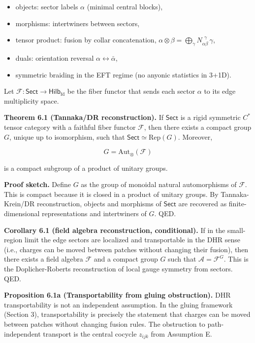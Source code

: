 \documentclass[11pt,a4paper]{article}
\theoremstyle{remark}
\providecommand{\tightlist}{%
  \setlength{\itemsep}{0pt}\setlength{\parskip}{0pt}}
\begin{document}
\begin{itemize}
\tightlist
\item
  objects: sector labels \(\alpha\) (minimal central blocks),
\item
  morphisms: intertwiners between sectors,
\item
  tensor product: fusion by collar concatenation, \(\alpha \otimes \beta = \bigoplus_\gamma N_{\alpha\beta}^{\ \ \gamma}\,\gamma\),
\item
  duals: orientation reversal \(\alpha \leftrightarrow \bar\alpha\),
\item
  symmetric braiding in the EFT regime (no anyonic statistics in 3+1D).
\end{itemize}

Let \(\mathcal F: \mathsf{Sect} \to \mathsf{Hilb}_{\mathrm{fd}}\) be the fiber functor
that sends each sector \(\alpha\) to its edge multiplicity space.

\textbf{Theorem 6.1 (Tannaka/DR reconstruction).} If \(\mathsf{Sect}\) is a rigid
symmetric \(C^*\) tensor category with a faithful fiber functor \(\mathcal F\),
then there exists a compact group \(G\), unique up to isomorphism, such that
\(\mathsf{Sect} \simeq \mathrm{Rep}(G)\). Moreover,

\[
G = \mathrm{Aut}_\otimes(\mathcal F)
\]

is a compact subgroup of a product of unitary groups.

\textbf{Proof sketch.} Define \(G\) as the group of monoidal natural automorphisms
of \(\mathcal F\). This is compact because it is closed in a product of
unitary groups. By Tannaka-Krein/DR reconstruction, objects and morphisms
of \(\mathsf{Sect}\) are recovered as finite-dimensional representations and
intertwiners of \(G\). QED.

\textbf{Corollary 6.1 (field algebra reconstruction, conditional).} If in the
small-region limit the edge sectors are localized and transportable in the
DHR sense (i.e., charges can be moved between patches without changing
their fusion), then there exists a field algebra \(\mathcal F\) and a compact
group \(G\) such that \(\mathcal A = \mathcal F^G\). This is the
Doplicher-Roberts reconstruction of local gauge symmetry from sectors.
QED.

\textbf{Proposition 6.1a (Transportability from gluing obstruction).} DHR
transportability is not an independent assumption. In the gluing framework
(Section 3), transportability is precisely the statement that charges can
be moved between patches without changing fusion rules. The obstruction to
path-independent transport is the central cocycle \(z_{ijk}\) from
Assumption E.
\end{document}
